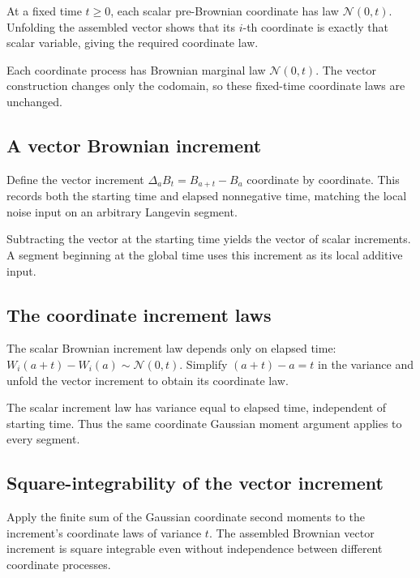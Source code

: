 \documentclass[11pt,a4paper]{article}
\begin{document}
At a fixed time \(t\ge0\), each scalar pre-Brownian coordinate has law \(\mathcal N(0,t)\). Unfolding the assembled vector shows that its \(i\)-th coordinate is exactly that scalar variable, giving the required coordinate law.



Each coordinate process has Brownian marginal law \(\mathcal N(0,t)\). The vector construction changes only the codomain, so these fixed-time coordinate laws are unchanged.


\subsection{\texorpdfstring{A vector Brownian increment}{A vector Brownian increment}}


Define the vector increment \(\Delta_aB_t=B_{a+t}-B_a\) coordinate by coordinate. This records both the starting time and elapsed nonnegative time, matching the local noise input on an arbitrary Langevin segment.



Subtracting the vector at the starting time yields the vector of scalar increments. A segment beginning at the global time uses this increment as its local additive input.


\subsection{\texorpdfstring{The coordinate increment laws}{The coordinate increment laws}}


The scalar Brownian increment law depends only on elapsed time: \(W_i(a+t)-W_i(a)\sim\mathcal N(0,t)\). Simplify \((a+t)-a=t\) in the variance and unfold the vector increment to obtain its coordinate law.



The scalar increment law has variance equal to elapsed time, independent of starting time. Thus the same coordinate Gaussian moment argument applies to every segment.


\subsection{\texorpdfstring{Square-integrability of the vector increment}{Square-integrability of the vector increment}}


Apply the finite sum of the Gaussian coordinate second moments to the increment's coordinate laws of variance \(t\). The assembled Brownian vector increment is square integrable even without independence between different coordinate processes.
\end{document}

